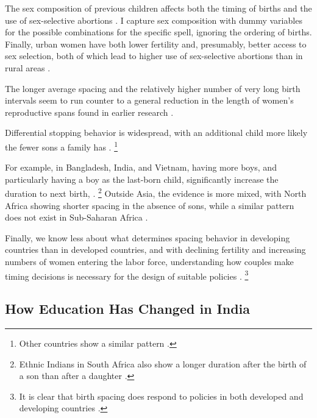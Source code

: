 The sex composition of previous children affects both the timing of births and the use of 
sex-selective abortions 
\citep{retherford03b,jha06,Bhalotra2008,abrevaya09,Portner2015b,Kumar2016,Soest2018}.
I capture sex composition with dummy variables for the
possible combinations for the specific spell, ignoring the ordering of births.
Finally, urban women have both lower fertility and, presumably, better access to
sex selection, both of which lead to higher use of sex-selective abortions than in 
rural areas \citep{retherford03b,jha06,Portner2015b}.


The longer average spacing and the relatively higher number of very long birth intervals 
seem to run counter to a general reduction in the length of women's reproductive spans 
found in earlier research \citep{Padmadas2004}.


Differential stopping behavior is widespread, with an additional child more likely the
fewer sons a family has 
\citep{repetto72,Das1987,Arnold1997,arnold98,clark00,Basu2010,Barcellos2014}.%
\footnote{
Other countries show a similar pattern
\citep[see, for example,][]{larsen98,filmer09,Altindag2016}.
}


For example, in Bangladesh, India, and Vietnam, having more boys, and particularly having 
a boy as the last-born child, significantly increase the duration to next birth,
\citep{Haughton1995,Haughton1996,Rahman1993,Bhalotra2008,Kumar2016,Soest2018}.%
\footnote{
Ethnic Indians in South Africa also show a longer duration after the birth of a 
son than after a daughter \citep{Gangadharan2003}.
}
Outside Asia, the evidence is more mixed, with North Africa showing shorter spacing in the 
absence of sons, while a similar pattern does not exist in Sub-Saharan Africa 
\citep{Rossi2015}.


Finally, we know less about what determines spacing behavior in developing countries than 
in developed countries, and with declining fertility and increasing numbers of women 
entering the labor force, understanding how couples make timing decisions is necessary 
for the design of suitable policies \citep{Portner2018}.%
\footnote{
It is clear that birth spacing does respond to policies in both developed and 
developing countries \citep{Pettersson-Lidbom2009,Todd2012,Meckel2015,Ghosh2018}.
}


\subsection{How Education Has Changed in India}

